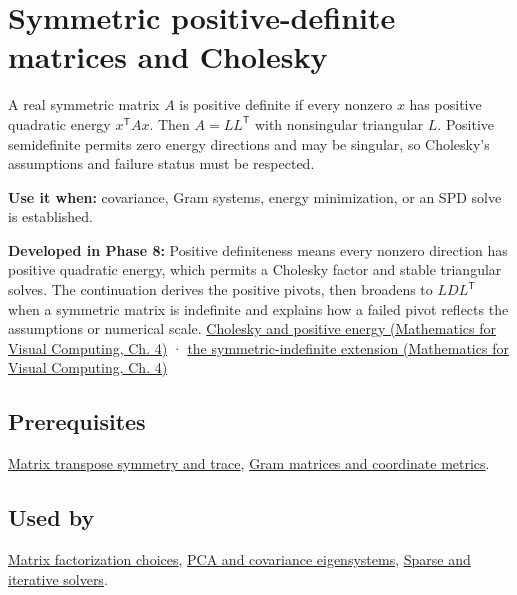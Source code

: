 \hypertarget{appendix-50d2ea3c9b26}{}\label{referencestart:appendix-50d2ea3c9b26}
\section{Symmetric positive-definite matrices and Cholesky}\label{appendix-50d2ea3c9b26-symmetric-positive-definite-matrices-and-cholesky}

A real symmetric matrix \(A\) is positive definite if every nonzero \(x\) has positive quadratic energy \(x^\mathsf T A x\). Then \(A=LL^\mathsf T\) with nonsingular triangular \(L\). Positive semidefinite permits zero energy directions and may be singular, so Cholesky's assumptions and failure status must be respected.

\textbf{Use it when:} covariance, Gram systems, energy minimization, or an SPD solve is established.

\textbf{Developed in Phase 8:} Positive definiteness means every nonzero direction has positive quadratic energy, which permits a Cholesky factor and stable triangular solves. The continuation derives the positive pivots, then broadens to \(LDL^\mathsf T\) when a symmetric matrix is indefinite and explains how a failed pivot reflects the assumptions or numerical scale. \href{../02-Mathematics-for-Visual-Computing/main.pdf\#nameddest=01-foundations-i-ch020-positive-definiteness-is-a-structural-promise}{Cholesky and positive energy (Mathematics for Visual Computing, Ch. 4)} · \href{../02-Mathematics-for-Visual-Computing/main.pdf\#nameddest=01-foundations-i-ch020-ldlt-reaches-symmetric-indefinite-matrices}{the symmetric-indefinite extension (Mathematics for Visual Computing, Ch. 4)}

\subsection{Prerequisites}\label{appendix-50d2ea3c9b26-prerequisites}

\hyperref[appendix-175ca5ff874d]{Matrix transpose symmetry and trace}, \hyperref[appendix-3b863809f82a]{Gram matrices and coordinate metrics}.

\subsection{Used by}\label{appendix-50d2ea3c9b26-used-by}

\hyperref[appendix-221a483bec2d]{Matrix factorization choices}, \hyperref[appendix-ad175ef3c5bf]{PCA and covariance eigensystems}, \hyperref[appendix-67c87a3d9e94]{Sparse and iterative solvers}.

